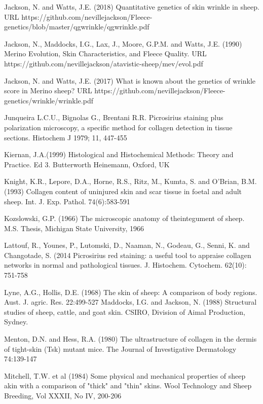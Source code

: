 \documentclass[titlepage]{article}  %
\begin{document}
\begin{thebibliography}{99}
Jackson, N. and Watts, J.E. (2018) Quantitative genetics of skin wrinkle in sheep. URL https://github.com/nevillejackson/Fleece-genetics/blob/master/qgwrinkle/qgwrinkle.pdf

Jackson, N., Maddocks, I.G., Lax, J., Moore, G.P.M. and Watts, J.E. (1990) Merino Evolution, Skin Characteristics, and Fleece Quality. URL https://github.com/nevillejackson/atavistic-sheep/mev/evol.pdf 

Jackson, N. and Watts, J.E. (2017) What is known about the genetics of wrinkle score in Merino sheep? URL https://github.com/nevillejackson/Fleece-genetics/wrinkle/wrinkle.pdf

Junqueira L.C.U., Bignolas G., Brentani R.R. Picrosirius staining plus polarization microscopy, a specific method for collagen detection in tissue sections. Histochem J 1979; 11, 447-455

Kiernan, J.A.(1999) Histological and Histochemical Methods: Theory and Practice. Ed 3. Butterworth Heinemann, Oxford, UK

Knight, K.R., Lepore, D.A., Horne, R.S., Ritz, M., Kumta, S. and O'Brian, B.M. (1993) Collagen content of uninjured skin and scar tissue in foetal and adult sheep. Int. J. Exp. Pathol. 74(6):583-591

Kozslowski, G.P. (1966) The microscopic anatomy of theintegument of sheep. M.S. Thesis, Michigan State University, 1966

Lattouf, R., Younes, P., Lutomski, D., Naaman, N., Godeau, G., Senni, K. and Changotade, S. (2014  Picrosirius red staining: a useful tool to appraise collagen networks in normal and pathological tissues. J. Histochem. Cytochem. 62(10): 751-758

Lyne, A.G., Hollis, D.E. (1968) The skin of sheep: A comparison of body regions. Aust. J. agric. Res. 22:499-527
Maddocks, I.G. and Jackson, N. (1988) Structural studies of sheep, cattle, and goat skin. CSIRO, Division of Aimal Production, Sydney.

Menton, D.N. and Hess, R.A. (1980) The ultrastructure of collagen in the dermis of tight-skin (Tsk) mutant mice. The Journal of Investigative Dermatology 74:139-147

Mitchell, T.W. et al (1984) Some physical and mechanical properties of sheep akin with a comparison of "thick" and "thin" skins. Wool Technology and Sheep Breeding, Vol XXXII, No IV, 200-206


\end{thebibliography}
\end{document}
